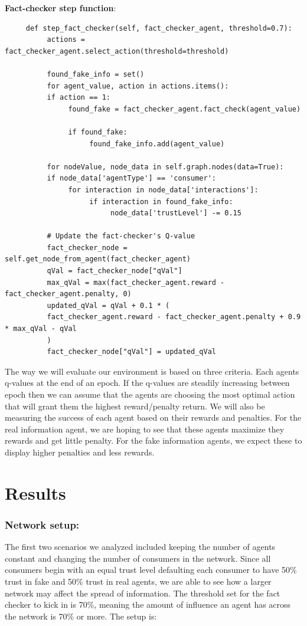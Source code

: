 \documentclass[twoside]{article}
\begin{document}
\textbf{Fact-checker step function}:

\begin{verbatim}
     def step_fact_checker(self, fact_checker_agent, threshold=0.7):
          actions = fact_checker_agent.select_action(threshold=threshold)

          found_fake_info = set()
          for agent_value, action in actions.items():
          if action == 1:
               found_fake = fact_checker_agent.fact_check(agent_value)
               
               if found_fake:
                    found_fake_info.add(agent_value)
          
          for nodeValue, node_data in self.graph.nodes(data=True):
          if node_data['agentType'] == 'consumer':
               for interaction in node_data['interactions']:
                    if interaction in found_fake_info:
                         node_data['trustLevel'] -= 0.15

          # Update the fact-checker's Q-value
          fact_checker_node = self.get_node_from_agent(fact_checker_agent)
          qVal = fact_checker_node["qVal"]
          max_qVal = max(fact_checker_agent.reward - fact_checker_agent.penalty, 0)
          updated_qVal = qVal + 0.1 * (
          fact_checker_agent.reward - fact_checker_agent.penalty + 0.9 * max_qVal - qVal
          )
          fact_checker_node["qVal"] = updated_qVal
\end{verbatim}

The way we will evaluate our environment is based on three criteria. Each agents q-values at the end of an epoch. If the q-values are steadily increasing between epoch then we can assume that the agents are choosing the most optimal action that will grant them the highest reward/penalty return. We will also be measuring the success of each agent based on their rewards and penalties. For the real information agent, we are hoping to see that these agents maximize they rewards and get little penalty. For the fake information agents, we expect these to display higher penalties and less rewards.


\section{Results}
\subsubsection{Network setup: }
The first two scenarios we analyzed included keeping the number of agents constant and changing the number of consumers in the network. Since all consumers begin with an equal trust level defaulting each consumer to have 50\% trust in fake and 50\% trust in real agents, we are able to see how a larger network may affect the spread of information. The threshold set for the fact checker to kick in is 70\%, meaning the amount of influence an agent has across the network is 70\% or more. The setup is:
\end{document}
